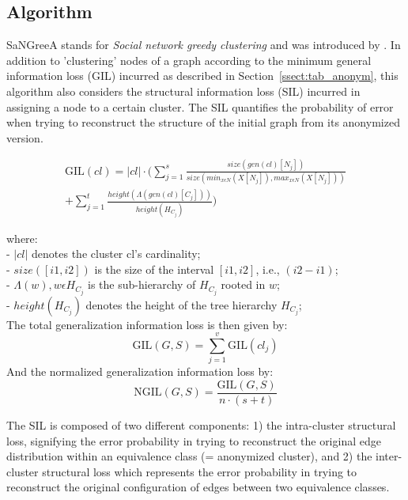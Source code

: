 \documentclass{llncs}
\providecommand{\abs}[1]{\lvert#1\rvert}
\begin{document}
\subsection{Algorithm}
\label{ssect:algorithm}

SaNGreeA stands for \textit{Social network greedy clustering} and was introduced by \cite{campan2009data}. In addition to 'clustering' nodes of a graph according to the minimum general information loss (GIL) incurred as described in Section~\ref{ssect:tab_anonym}, this algorithm also considers the structural information loss (SIL) incurred in assigning a node to a certain cluster. The SIL quantifies the probability of error when trying to reconstruct the structure of the initial graph from its anonymized version.

\begin{equation*}
\begin{split}
\text{GIL}(cl) = \abs{cl} \cdot (\sum_{j=1}^{s} \frac{size(gen(cl)[N_j])}{size(min_{x \epsilon N} (X[N_j]), max_{x \epsilon N} (X[N_j]))} \\ 
+ \sum_{j=1}^{t} \frac{height(\Lambda(gen(cl)[C_j]))}{height(H_{C_j})})    
\end{split}    
\end{equation*}


where:\\
- $\abs{cl}$ denotes the cluster cl's cardinality; \\
- $size([i1,i2])$ is the size of the interval $[i1,i2]$, i.e., $(i2-i1)$; \\
- $\Lambda(w), w \epsilon H_{C_j}$ is the sub-hierarchy of $H_{C_j}$ rooted in $w$; \\
- $height(H_{C_j})$ denotes the height of the tree hierarchy $H_{C_j}$; \\


The total generalization information loss is then given by:
\begin{equation*}
\text{GIL}(G,S) = \sum_{j=1}^{v} \text{GIL}(cl_j)
\end{equation*}
And the normalized generalization information loss by:
\begin{equation*}
\text{NGIL}(G,S) = \frac{\text{GIL}(G,S)}{n \cdot (s+t)}
\end{equation*}

The SIL is composed of two different components: 1) the intra-cluster structural loss, signifying the error probability in trying to reconstruct the original edge distribution within an equivalence class (= anonymized cluster), and 2) the inter-cluster structural loss which represents the error probability in trying to reconstruct the original configuration of edges between two equivalence classes.
\end{document}

